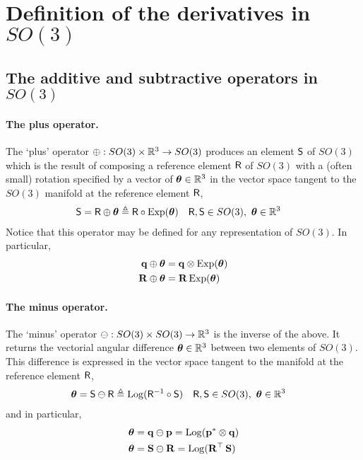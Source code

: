 
\appendices

\section{Definition of the derivatives in $SO(3)$}
\label{sec:derivatives_SO3}

\subsection{The additive and subtractive operators in $SO(3)$}

%

\paragraph{The plus operator.}
The `plus' operator $\oplus:SO(3)\times{\mathbb R}^3\to SO(3)$ produces an element $\mathsf S$ of $SO(3)$ which is the result of composing a reference element $\mathsf R$ of $SO(3)$ with a (often small) rotation specified by a vector of ${{\bm \theta}}\in{\mathbb R}^3$ in the vector space tangent to the $SO(3)$ manifold at the reference element $\mathsf R$,
%
\begin{align}
\mathsf S = \mathsf R\oplus {{\bm \theta}} &\triangleq \mathsf R\circ\operatorname*{Exp}({{\bm \theta}}) && \mathsf R,\mathsf S\in SO(3),~ {{\bm \theta}}\in{\mathbb R}^3 
\end{align}
%
Notice that this operator may be defined for any representation of $SO(3)$. In particular, %
%
\begin{align}
{\bf q}\oplus{{\bm \theta}} &= {\bf q}\otimes\operatorname*{Exp}({{\bm \theta}}) \\
{\bf R}\oplus {{\bm \theta}} &= {\bf R}\operatorname*{Exp}({{\bm \theta}}) 
\end{align}

\paragraph{The minus operator.}
The `minus' operator $\ominus:SO(3)\times SO(3)\to{\mathbb R}^3$ is the inverse of the above. It returns the vectorial angular difference ${{\bm \theta}}\in{\mathbb R}^3$ between two elements of $SO(3)$. This difference is expressed in the  vector space tangent to the manifold at the reference element $\mathsf R$, 
%
\begin{align}
{{\bm \theta}}=\mathsf S\ominus \mathsf R
&\triangleq \operatorname*{Log}(\mathsf R^{-1} \circ \mathsf S)     && \mathsf R,\mathsf S\in SO(3),~ {{\bm \theta}}\in{\mathbb R}^3  
\end{align}
%
and in particular,
%
\begin{align}
{{\bm \theta}} &= {\bf q}\ominus{\bf p} = \operatorname*{Log}({\bf p}^*\otimes{\bf q})                      \\
{{\bm \theta}} &= {\bf S}\ominus{\bf R} = \operatorname*{Log}({\bf R}^{\top}\,{\bf S})                         
\end{align}

